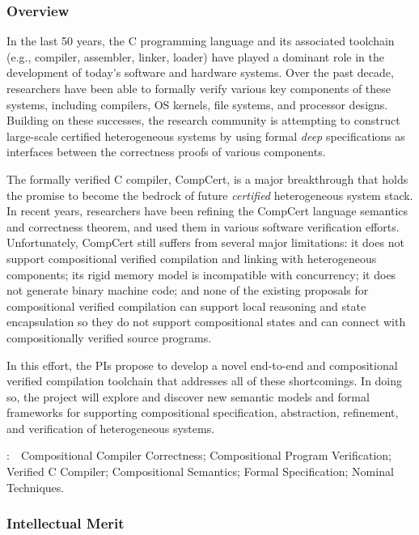 \subsubsection*{Overview}

In the last 50 years, the C programming language and its associated
toolchain (e.g., compiler, assembler, linker, loader) have played a
dominant role in the development of today's software and hardware
systems.  Over the past decade, researchers have been able to formally
verify various key components of these systems, including compilers,
OS kernels, file systems, and processor designs. Building on these
successes, the research community is attempting to construct
large-scale certified heterogeneous systems by using formal {\em deep}
specifications as interfaces between the correctness proofs of various
components.

The formally verified C compiler, CompCert, is a major breakthrough
that holds the promise to become the bedrock of future {\em certified}
heterogeneous system stack. In recent years, researchers have been
refining the CompCert language semantics and correctness theorem, and
used them in various software verification efforts.  Unfortunately,
CompCert still suffers from several major limitations: it does not
support compositional verified compilation and linking with
heterogeneous components; its rigid memory model is incompatible with
concurrency; it does not generate binary machine code; and none of the
existing proposals for compositional verified compilation can support
local reasoning and state encapsulation so they do not support
compositional states and can connect with compositionally verified
source programs.

In this effort, the PIs propose to develop a novel end-to-end and
compositional verified
compilation toolchain that addresses all of these shortcomings. In
doing so, the project will explore and discover new semantic
models and formal frameworks for supporting compositional
specification, abstraction, refinement, and verification of
heterogeneous systems. 

\vspace{+2mm}
:~~{Compositional Compiler Correctness;
Compositional Program Verification; Verified C Compiler;
Compositional Semantics; Formal Specification; Nominal Techniques.}

\subsubsection*{Intellectual Merit}

